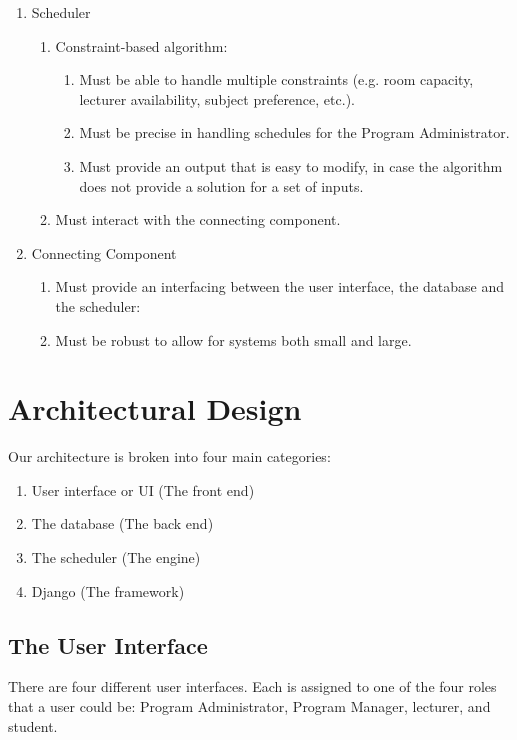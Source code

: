 \documentclass[12pt]{article}
\begin{document}
\begin{enumerate}
\begin{enumerate}
	\end{enumerate}
\item Scheduler
      \begin{enumerate}
      \item Constraint-based algorithm:
      	    \begin{enumerate}
            \item Must be able to handle multiple constraints (e.g. room capacity, lecturer availability, subject preference, etc.).
	    \item Must be precise in handling schedules for the Program Administrator.
	    \item Must provide an output that is easy to modify, in case the algorithm does not provide a solution for a set of inputs.
	    \end{enumerate}
	\item Must interact with the connecting component.
     \end{enumerate}
\item Connecting Component
      \begin{enumerate}
      \item Must provide an interfacing between the user interface, the database and the scheduler:
    \item Must be robust to allow for systems both small and large.
     \end{enumerate}
\end{enumerate}

\section{Architectural Design} %
Our architecture is broken into four main categories:
\begin{enumerate}
\item User interface or UI (The front end)
\item The database  (The back end)
\item The scheduler (The engine)
\item Django (The framework)
\end{enumerate}

\subsection{The User Interface}
There are four different user interfaces. Each is assigned to one of the four roles that a user could be: Program Administrator, Program Manager, lecturer, and student.
\end{document}
